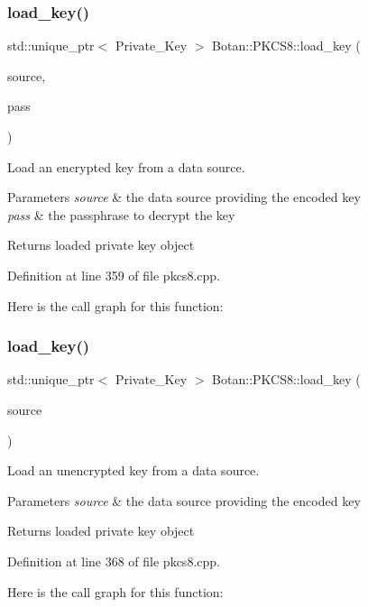 \subsubsection{\texorpdfstring{load\+\_\+key()}{load\_key()}\hspace{0.1cm}{\footnotesize\ttfamily [2/3]}}
{\footnotesize\ttfamily std\+::unique\+\_\+ptr$<$ Private\+\_\+\+Key $>$ Botan\+::\+P\+K\+C\+S8\+::load\+\_\+key (\begin{DoxyParamCaption}\item[{Data\+Source \&}]{source,  }\item[{const std\+::string \&}]{pass }\end{DoxyParamCaption})}

Load an encrypted key from a data source. 
\begin{DoxyParams}{Parameters}
{\em source} & the data source providing the encoded key \\
\hline
{\em pass} & the passphrase to decrypt the key \\
\hline
\end{DoxyParams}
\begin{DoxyReturn}{Returns}
loaded private key object 
\end{DoxyReturn}


Definition at line 359 of file pkcs8.\+cpp.

Here is the call graph for this function\+:
\mbox{\label{namespace_botan_1_1_p_k_c_s8_ae1ad1d7d3cac5fbb7edf2ce073887a70}} 
\subsubsection{\texorpdfstring{load\+\_\+key()}{load\_key()}\hspace{0.1cm}{\footnotesize\ttfamily [3/3]}}
{\footnotesize\ttfamily std\+::unique\+\_\+ptr$<$ Private\+\_\+\+Key $>$ Botan\+::\+P\+K\+C\+S8\+::load\+\_\+key (\begin{DoxyParamCaption}\item[{Data\+Source \&}]{source }\end{DoxyParamCaption})}

Load an unencrypted key from a data source. 
\begin{DoxyParams}{Parameters}
{\em source} & the data source providing the encoded key \\
\hline
\end{DoxyParams}
\begin{DoxyReturn}{Returns}
loaded private key object 
\end{DoxyReturn}


Definition at line 368 of file pkcs8.\+cpp.

Here is the call graph for this function\+:
